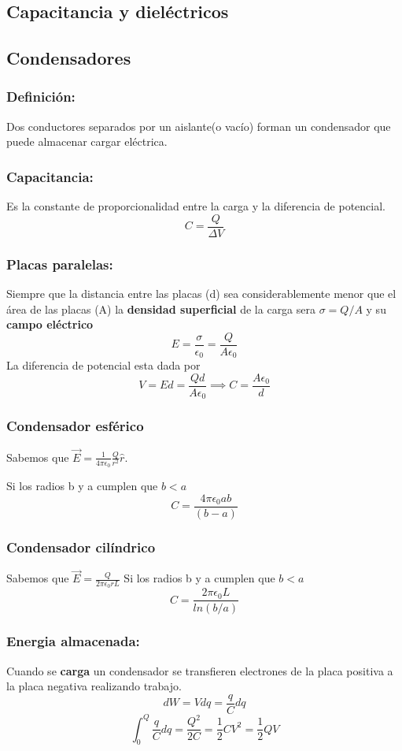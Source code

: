 \documentclass[a4paper, 10pt]{article}
\begin{document}
\begin{multicols*}{2}
	    
	    
	\section{Capacitancia y dieléctricos}
	\subsection{Condensadores}
	\subsubsection{Definición:} Dos conductores separados por un aislante(o vacío) forman un condensador que puede almacenar cargar eléctrica.
	    
	\subsubsection{Capacitancia:} Es la constante de proporcionalidad entre la carga y la diferencia de potencial. $$C = \frac{Q}{\Delta V}$$
	    
	\subsubsection{Placas paralelas:} Siempre que la distancia entre las placas (d) sea considerablemente menor que el área de las placas (A)
  la \textbf{densidad superficial} de la carga sera 
  $\sigma = Q/A $ y su \textbf{campo eléctrico} 
  $$E = \frac{\sigma}{\epsilon_0} = \frac{Q}{A \epsilon_0}$$
	La diferencia de potencial esta dada por 
  $$ V = Ed = \frac{Qd}{A\epsilon_0} \implies C = \frac{A\epsilon_0}{d}$$ 
	    
	\subsubsection{Condensador esférico}
	Sabemos que $\vec{E} = \frac{1}{4 \pi \epsilon_0} \frac{Q}{r^2}\hat{r}$.

	Si los radios b y a cumplen que $b<a$
	$$C = \frac{4 \pi \epsilon_0 ab}{(b-a)}$$
	    
	\subsubsection{Condensador cilíndrico}
	Sabemos que $\vec{E} = \frac{Q}{2 \pi \epsilon_0 r L}$
	Si los radios b y a cumplen que $b<a$
	$$C = \frac{2 \pi \epsilon_0 L}{ln(b/a)}$$
	    
	\subsubsection{Energia almacenada:}  
  Cuando se \textbf{carga} un condensador se transfieren electrones de la placa positiva a la placa negativa realizando trabajo.
	$$dW = Vdq = \frac{q}{C}dq $$
	$$\int_0^Q \frac{q}{C}dq = \frac{Q^2}{2C} = \frac{1}{2}CV^2 = \frac{1}{2}QV$$
	    

\end{multicols*}
\end{document}
